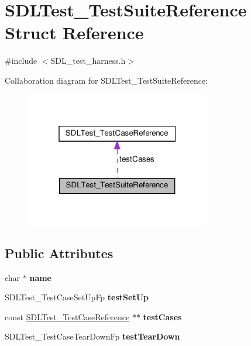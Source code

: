 \hypertarget{structSDLTest__TestSuiteReference}{}\section{S\+D\+L\+Test\+\_\+\+Test\+Suite\+Reference Struct Reference}
\label{structSDLTest__TestSuiteReference}


{\ttfamily \#include $<$S\+D\+L\+\_\+test\+\_\+harness.\+h$>$}



Collaboration diagram for S\+D\+L\+Test\+\_\+\+Test\+Suite\+Reference\+:\nopagebreak
\begin{figure}[H]
\begin{center}
\leavevmode
\includegraphics[width=229pt]{structSDLTest__TestSuiteReference__coll__graph}
\end{center}
\end{figure}
\subsection*{Public Attributes}
\begin{DoxyCompactItemize}
\item 
\mbox{\label{structSDLTest__TestSuiteReference_a8b002d932f91b321b384e59ae17f8f39}} 
char $\ast$ {\bfseries name}
\item 
\mbox{\label{structSDLTest__TestSuiteReference_a8aa788b982efb93c93c2ab01202e0007}} 
S\+D\+L\+Test\+\_\+\+Test\+Case\+Set\+Up\+Fp {\bfseries test\+Set\+Up}
\item 
\mbox{\label{structSDLTest__TestSuiteReference_a06d97ce5bcf9ceb1300cc4aa39c028d3}} 
const \hyperlink{structSDLTest__TestCaseReference}{S\+D\+L\+Test\+\_\+\+Test\+Case\+Reference} $\ast$$\ast$ {\bfseries test\+Cases}
\item 
\mbox{\label{structSDLTest__TestSuiteReference_ad66abaf20653fd7361d28c69f88ac702}} 
S\+D\+L\+Test\+\_\+\+Test\+Case\+Tear\+Down\+Fp {\bfseries test\+Tear\+Down}
\end{DoxyCompactItemize}


